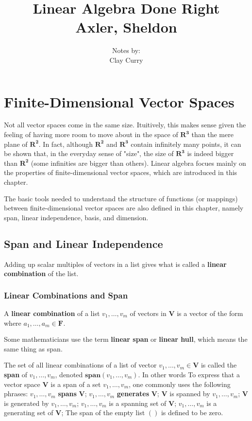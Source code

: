 \documentclass[11pt]{article} %
\title{Linear Algebra Done Right \\ Axler, Sheldon}
\author{Notes by:  \\ Clay Curry}
\date{}
\newcommand\R[1]{\mathbf{R^{#1}}}
\newcommand\F[1]{\mathbf{F^{#1}}}
\newcommand\V{\mathbf{V}}
\newcommand\lc[3]{#1_1 #2_1 + \cdots + #1_{#3} #2_{#3}}
\newcommand\ls[2]{#1_1, \ldots, #1_{#2}}
\renewcommand\span[1]{\mathbf{span}(#1)}
\newcommand\set[1]{\{#1\}}
\begin{document}
\section{Finite-Dimensional Vector Spaces}
Not all vector spaces come in the same size. Ituitively, this makes sense given the feeling of having more room to move about in the space of $\R{3}$ than the mere plane of $\R{2}$. In fact, although $\R{2}$ and $\R{3}$ contain infinitely many points, it can be shown that, in the everyday sense of "size", the size of $\R{3}$ is indeed bigger than $\R{2}$ (some infinities are bigger than others). Linear algebra focues mainly on the properties of finite-dimensional vector spaces, which are introduced in this chapter. 

The basic tools needed to understand the structure of functions (or mappings) between finite-dimensional vector spaces are also defined in this chapter, namely span, linear independence, basis, and dimension. 

\subsection{Span and Linear Independence}
Adding up scalar multiples of vectors in a list gives what is called a \textbf{linear combination} of the list.

\subsubsection{Linear Combinations and Span}

{
A \textbf{linear combination} of a list $\ls{v}{m}$ of vectors in $\V$ is a vector of the form
\mathdiv{\lc{a}{v}{m}}
where $\ls{a}{m} \in \F{}$.
}

Some mathematicians use the term \textbf{linear span} or \textbf{linear hull}, which means the same thing as span. 

{
The set of all linear combinations of a list of vector $\ls{v}{m} \in \V$ is called the \textbf{span} of $\ls{v}{m}$, denoted $\span{\ls{v}{m}}$. In other words
\mathdiv{\span{\ls{v}{m}} = \set{\lc{a}{v}{m} : \ls{a}{m} \in \F{}}.}
To express that a vector space $\V$ is a span of a set $\ls{v}{m}$, one commonly uses the following phrases:
\points
{$\ls{v}{m}$ \textbf{spans} $\V$;}
{$\ls{v}{m}$ \textbf{generates} $\V$;}
{$\V$ is spanned by $\ls{v}{m}$;}
{$\V$ is generated by $\ls{v}{m}$;}
{$\ls{v}{m}$ is a spanning set of $\V$;}
{$\ls{v}{m}$ is a generating set of $\V$;}
The span of the empty list $()$ is defined to be zero.
}
\end{document}
